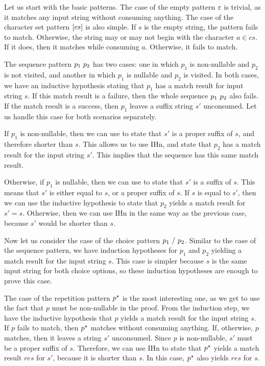 Let us start with the basic patterns.
The case of the empty pattern $\varepsilon{}$ is trivial,
as it matches any input string without consuming anything.
The case of the character set pattern $[cs]$ is also simple.
If $s$ is the empty string, the pattern fails to match.
Otherwise, the string may or may not begin with the character $a \in cs$.
If it does, then it matches while consuming $a$.
Otherwise, it fails to match.

The sequence pattern $p_1\ p_2$ has two cases:
one in which $p_1$ is non-nullable and $p_2$ is not visited,
and another in which $p_1$ is nullable and $p_2$ is visited.
In both cases, we have an inductive hypothesis stating that
$p_1$ has a match result for input string $s$.
If this match result is a failure,
then the whole sequence $p_1\ p_2$ also fails.
If the match result is a success,
then $p_1$ leaves a suffix string $s'$ unconsumed.
Let us handle this case for both scenarios separately.

If $p_1$ is non-nullable,
then we can use 
to state that $s'$ is a proper suffix of $s$,
and therefore shorter than $s$.
This allows us to use IHn,
and state that $p_2$ has a match result for the input string $s'$.
This implies that the sequence has this same match result.

Otherwise, if $p_1$ is nullable, then we can use
 to state that
$s'$ is a suffix of $s$.
This means that $s'$ is either equal to $s$, or a proper suffix of $s$.
If $s$ is equal to $s'$,
then we can use the inductive hypothesis
to state that $p_2$ yields a match result for $s'=s$.
Otherwise, then we can use IHn in the same way as the previous case,
because $s'$ would be shorter than $s$.

Now let us consider the case of the choice pattern $p_1\ /\ p_2$.
Similar to the case of the sequence pattern,
we have induction hypotheses for $p_1$ and $p_2$
yielding a match result for the input string $s$.
This case is simpler because $s$ is the same input string for both choice options,
so these induction hypotheses are enough to prove this case.

The case of the repetition pattern $p^\star$ is the most interesting one,
as we get to use the fact that $p$ must be non-nullable in the proof.
From the induction step, we have the inductive hypothesis that
$p$ yields a match result for the input string $s$.
If $p$ fails to match, then $p^\star$ matches without consuming anything.
If, otherwise, $p$ matches, then it leaves a string $s'$ unconsumed.
Since $p$ is non-nullable, $s'$ must be a proper suffix of $s$.
Therefore, we can use IHn to state that $p^\star$
yields a match result $res$ for $s'$, because it is shorter than $s$.
In this case, $p^\star$ also yields $res$ for $s$.

